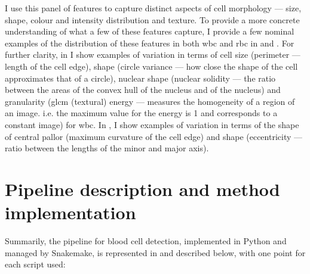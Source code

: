 I use this panel of features to capture distinct aspects of cell morphology --- size, shape, colour and intensity distribution and texture. To provide a more concrete understanding of what a few of these features capture, I provide a few nominal examples of the distribution of these features in both \ac{wbc} and \ac{rbc} in  and . For further clarity, in  I show examples of variation in terms of cell size (perimeter --- length of the cell edge), shape (circle variance --- how close the shape of the cell approximates that of a circle), nuclear shape (nuclear solidity --- the ratio between the areas of the convex hull of the nucleus and of the nucleus) and granularity (\ac{glcm} (textural) energy --- measures the homogeneity of a region of an image. i.e. the maximum value for the energy is 1 and corresponds to a constant image) for \ac{wbc}. In , I show examples of variation in terms of the shape of central pallor (maximum curvature of the cell edge) and shape (eccentricity --- ratio between the lengths of the minor and major axis).

\begin{figure}[!ht]
    \label{fig:feature-examples-wbc}
\end{figure}

\begin{figure}[!ht]
    \label{fig:feature-examples-rbc}
\end{figure}

\section{Pipeline description and method implementation}

Summarily, the pipeline for blood cell detection, implemented in Python and managed by Snakemake, is represented in  and described below, with one point for each script used:

